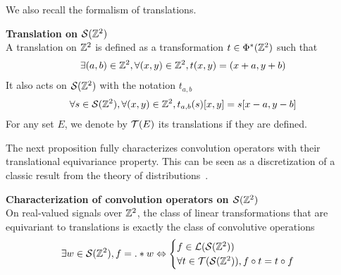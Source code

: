

We also recall the formalism of translations.

\begin{definition}\textbf{Translation on $\mathcal{S}(\mathbb{Z}^2)$}\\
A translation on $\mathbb{Z}^2$ is defined as a transformation $t \in \Phi^*(\mathbb{Z}^2)$ such that
\begin{gather*}
\exists (a,b) \in \mathbb{Z}^2, \forall (x,y) \in \mathbb{Z}^2, t(x,y) = (x+a,y+b)
\end{gather*}
It also acts on $\mathcal{S}(\mathbb{Z}^2)$ with the notation $t_{a,b}$ \ie
\begin{gather*}
\forall s \in \mathcal{S}(\mathbb{Z}^2), \forall (x,y) \in \mathbb{Z}^2, t_{a,b}(s)[x,y] = s[x-a, y-b]
\end{gather*}
For any set $E$, we denote by $\mathcal{T}(E)$ its translations if they are defined.
\end{definition}

The next proposition fully characterizes convolution operators with their translational equivariance property. This can be seen as a discretization of a classic result from the theory of distributions~\citep{schwartz1957theorie}.

\begin{proposition}\textbf{Characterization of convolution operators on $\mathcal{S}(\mathbb{Z}^2)$}\\
On real-valued signals over $\mathbb{Z}^2$, the class of linear transformations that are equivariant to translations is exactly the class of convolutive operations \ie
\begin{gather*}
\exists w \in \mathcal{S}(\mathbb{Z}^2), f = . \ast w \Leftrightarrow
\begin{cases}
 f \in \mathcal{L}(\mathcal{S}(\mathbb{Z}^2))\\
 \forall t \in \mathcal{T}(\mathcal{S}(\mathbb{Z}^2)), f \circ t = t \circ f
\end{cases}
\end{gather*}
\label{prop:equi}
\end{proposition}

